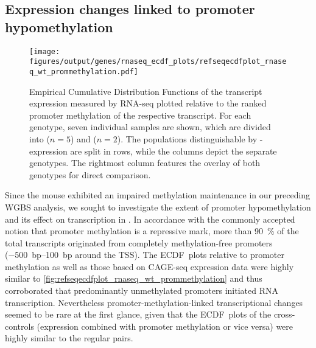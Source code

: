 \subsection{Expression changes linked to promoter hypomethylation}
\label{chap:r:transcription:promhypooverall}

\begin{figure}[!ht]
	\centering
	\texttt{[image: figures/output/genes/rnaseq\_ecdf\_plots/refseqecdfplot\_rnaseq\_wt\_prommethylation.pdf]} 
	\caption{Empirical Cumulative Distribution Functions of the transcript expression measured by RNA-seq plotted relative to the ranked promoter methylation of the respective transcript. For each genotype, seven individual samples are shown, which are divided into \kithi ($n\!= \!5$) and \kitlow ($n\!= \!2$). The populations distinguishable by \kit-expression are split in rows, while the columns depict the separate genotypes. The rightmost column features the overlay of both genotypes for direct comparison.}
	\label{fig:refseqecdfplot_rnaseq_wt_prommethylation}
\end{figure}


Since the \dnmtchip mouse exhibited an impaired methylation maintenance in our preceding WGBS analysis, we sought to investigate the extent of promoter hypomethylation and its effect on transcription in \dnmtchip. In accordance with the commonly accepted notion that promoter methylation is a repressive mark, more than \SI{90}{\percent} of the total transcripts originated from completely methylation-free promoters (\SIrange{-500}{+100}{bp} around the TSS). The ECDF~plots relative to \dnmtchip promoter methylation as well as those based on CAGE-seq expression data were highly similar to \autoref{fig:refseqecdfplot_rnaseq_wt_prommethylation} and thus corroborated that predominantly unmethylated promoters initiated RNA transcription\dns. Nevertheless promoter-methylation-linked transcriptional changes seemed to be rare at the first glance, given that the ECDF~plots of the cross-controls (\dnmtchip expression combined with \dnmtwt promoter methylation or vice versa) were highly similar to the regular pairs. 


